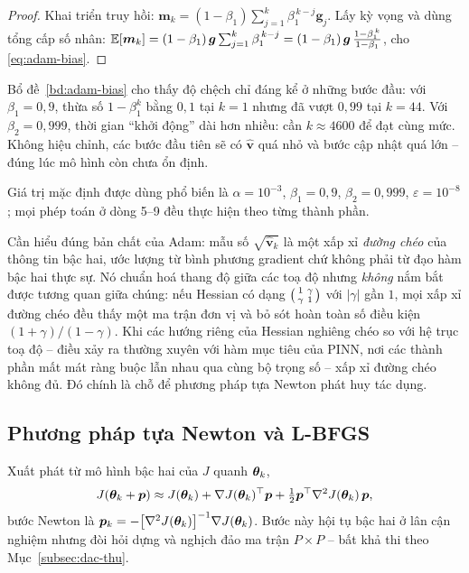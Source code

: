 \begin{proof}
Khai triển truy hồi:
$\bm{m}_k = (1-\beta_1)\sum_{j=1}^{k}\beta_1^{\,k-j}\bm{g}_j$. Lấy kỳ vọng và
dùng tổng cấp số nhân:
$\mathbb{E}[\bm{m}_k] = (1-\beta_1)\,\bm{g}\sum_{j=1}^{k}\beta_1^{\,k-j}
= (1-\beta_1)\,\bm{g}\,\frac{1-\beta_1^{\,k}}{1-\beta_1}$, cho
\eqref{eq:adam-bias}.
\end{proof}
 
Bổ đề~\ref{bd:adam-bias} cho thấy độ chệch chỉ đáng kể ở những bước đầu: với
$\beta_1 = 0{,}9$, thừa số $1-\beta_1^k$ bằng $0{,}1$ tại $k=1$ nhưng đã vượt
$0{,}99$ tại $k = 44$. Với $\beta_2 = 0{,}999$, thời gian ``khởi động'' dài hơn
nhiều: cần $k \approx 4600$ để đạt cùng mức. Không hiệu chỉnh, các bước đầu tiên
sẽ có $\hat{\bm v}$ quá nhỏ và bước cập nhật quá lớn -- đúng lúc mô hình còn chưa
ổn định.
 
Giá trị mặc định được dùng phổ biến là $\alpha = 10^{-3}$, $\beta_1 = 0{,}9$,
$\beta_2 = 0{,}999$, $\varepsilon = 10^{-8}$; mọi phép toán ở dòng 5--9 đều thực
hiện theo từng thành phần.
 
\begin{nhanxet}
\label{nx:adam-duong-cheo}
Cần hiểu đúng bản chất của Adam: mẫu số $\sqrt{\hat{\bm{v}}_k}$ là một xấp xỉ
\emph{đường chéo} của thông tin bậc hai, ước lượng từ bình phương gradient chứ
không phải từ đạo hàm bậc hai thực sự. Nó chuẩn hoá thang độ giữa các toạ độ
nhưng \emph{không} nắm bắt được tương quan giữa chúng: nếu Hessian có dạng
$\begin{psmallmatrix} 1 & \gamma \\ \gamma & 1\end{psmallmatrix}$ với
$|\gamma|$ gần $1$, mọi xấp xỉ đường chéo đều thấy một ma trận đơn vị và bỏ sót
hoàn toàn số điều kiện $(1+\gamma)/(1-\gamma)$. Khi các hướng riêng của Hessian
nghiêng chéo so với hệ trục toạ độ -- điều xảy ra thường xuyên với hàm mục tiêu
của PINN, nơi các thành phần mất mát ràng buộc lẫn nhau qua cùng bộ trọng số --
xấp xỉ đường chéo không đủ. Đó chính là chỗ để phương pháp tựa Newton phát huy
tác dụng.
\end{nhanxet}
 
\subsection{Phương pháp tựa Newton và L-BFGS}
\label{subsec:lbfgs}
 
Xuất phát từ mô hình bậc hai của $J$ quanh $\bm{\theta}_k$,
\[
J(\bm{\theta}_k + \bm{p}) \approx J(\bm{\theta}_k)
 + \nabla J(\bm{\theta}_k)^{\top}\bm{p}
 + \tfrac{1}{2}\bm{p}^{\top}\nabla^2 J(\bm{\theta}_k)\,\bm{p},
\]
bước Newton là
$\bm{p}_k = -\big[\nabla^2 J(\bm{\theta}_k)\big]^{-1}\nabla J(\bm{\theta}_k)$. Bước này
hội tụ bậc hai ở lân cận nghiệm nhưng đòi hỏi dựng và nghịch đảo ma trận
$P\times P$ -- bất khả thi theo Mục~\ref{subsec:dac-thu}.
 
